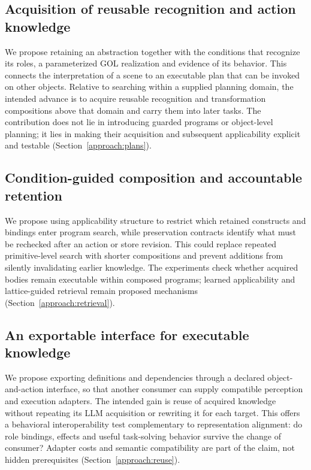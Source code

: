 \documentclass[11pt]{article}
\begin{document}
\subsection{Acquisition of reusable recognition and action knowledge}
We propose retaining an abstraction together with the conditions that recognize its roles, a parameterized GOL realization and evidence of its behavior. This connects the interpretation of a scene to an executable plan that can be invoked on other objects. Relative to searching within a supplied planning domain, the intended advance is to acquire reusable recognition and transformation compositions above that domain and carry them into later tasks. The contribution does not lie in introducing guarded programs or object-level planning; it lies in making their acquisition and subsequent applicability explicit and testable (Section~\ref{approach:plans}).

\subsection{Condition-guided composition and accountable retention}
We propose using applicability structure to restrict which retained constructs and bindings enter program search, while preservation contracts identify what must be rechecked after an action or store revision. This could replace repeated primitive-level search with shorter compositions and prevent additions from silently invalidating earlier knowledge. The experiments check whether acquired bodies remain executable within composed programs; learned applicability and lattice-guided retrieval remain proposed mechanisms (Section~\ref{approach:retrieval}).

\subsection{An exportable interface for executable knowledge}
We propose exporting definitions and dependencies through a declared object-and-action interface, so that another consumer can supply compatible perception and execution adapters. The intended gain is reuse of acquired knowledge without repeating its LLM acquisition or rewriting it for each target. This offers a behavioral interoperability test complementary to representation alignment: do role bindings, effects and useful task-solving behavior survive the change of consumer? Adapter costs and semantic compatibility are part of the claim, not hidden prerequisites (Section~\ref{approach:reuse}).
\end{document}
